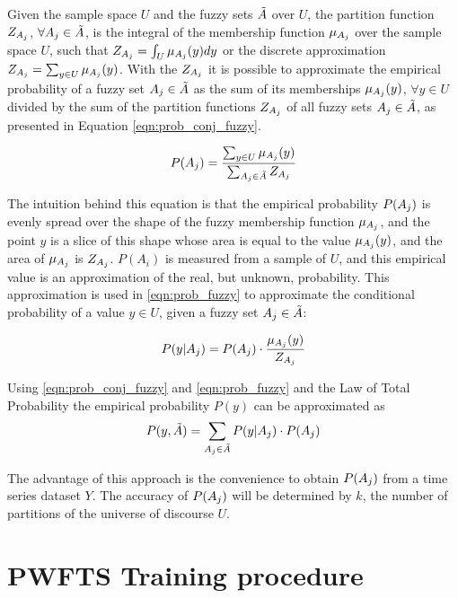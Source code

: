 Given the sample space $U$ and the fuzzy sets $\tilde{A}$ over $U$, the partition function $Z_{A_j}$, $\forall A_j \in \tilde{A}$, is the integral of the membership function $\mu_{A_j}$ over the sample space $U$, such that $Z_{A_j} = \int_U \mu_{A_j}(y) dy$ or the discrete approximation $Z_{A_j} = \sum_{y \in U} \mu_{A_j}(y)$. With the $Z_{A_j}$ it is possible to approximate the empirical probability of a fuzzy set $A_j \in \tilde{A}$ as the sum of its memberships $\mu_{A_j}(y)$, $\forall y \in U$ divided by the sum of the partition functions $Z_{A_j}$ of all fuzzy sets $A_j \in \tilde{A}$, as presented in Equation \eqref{eqn:prob_conj_fuzzy}. 

\begin{equation}
P(A_j) = \frac{\sum_{y \in U} \mu_{A_j}(y)}{\sum_{A_j \in \tilde{A}}Z_{A_j}} 
\label{eqn:prob_conj_fuzzy}
\end{equation}

The intuition behind this equation is that the empirical probability $P(A_j)$ is evenly spread over the shape of the fuzzy membership function $\mu_{A_j}$, and the point $y$ is a slice of this shape whose area is equal to the value $\mu_{A_j}(y)$, and the area of $\mu_{A_j}$ is $Z_{A_j}$. $P(A_i)$ is measured from a sample of $U$, and this empirical value is an approximation of the real, but unknown, probability. This approximation is used in \eqref{eqn:prob_fuzzy} to approximate the conditional probability of a value $y \in U$, given a fuzzy set $A_j \in \tilde{A}$:

\begin{equation}
P(y | A_j) = P(A_j) \cdot \frac{\mu_{A_j}(y)}{Z_{A_j}}
\label{eqn:prob_fuzzy}
\end{equation}

Using \eqref{eqn:prob_conj_fuzzy} and \eqref{eqn:prob_fuzzy} and the Law of Total Probability the empirical probability $P(y)$ can be approximated as 
\begin{equation}
P(y,\tilde{A}) = \sum_{A_j \in \tilde{A}} P(y | A_j)\cdot P(A_j)
\end{equation}

The advantage of this approach is the convenience to obtain $P(A_j)$ from a time series dataset $Y$. The accuracy of $P(A_j)$ will be determined by $k$, the number of partitions of the universe of discourse $U$.


\section{PWFTS Training procedure}
\label{sec:pwfts_training}

